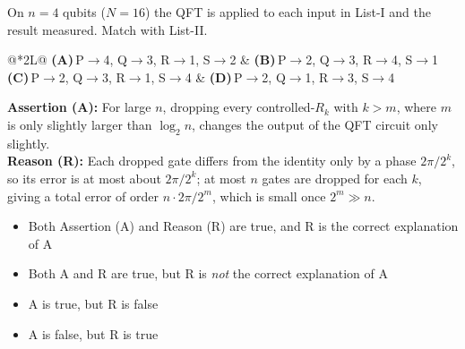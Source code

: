 \documentclass[11pt,a4paper]{article}
\newcommand{\optlabel}[1]{\textbf{(#1)}}
\newenvironment{qitem}[1]{\begin{list}{}{\setlength{\leftmargin}{3.3em}\setlength{\labelwidth}{3.1em}%
  \setlength{\labelsep}{0.2em}\setlength{\topsep}{3pt}\setlength{\parsep}{3pt}}\item[\textbf{Q.#1}\hfill]}{\end{list}}
\newcommand{\qsep}{\par\vspace{2pt}{\color{black!15}\hrule}\vspace{4pt}}
\begin{document}
\begin{qitem}{76}
On $n = 4$ qubits ($N = 16$) the QFT is applied to each input in List-I and the result measured. Match with List-II.
\par\smallskip{}
\par\smallskip\noindent\begin{tabularx}{\linewidth}{@{}*{2}{L}@{}}
\optlabel{A}\,P$\to$4, Q$\to$3, R$\to$1, S$\to$2 & \optlabel{B}\,P$\to$2, Q$\to$3, R$\to$4, S$\to$1 \\[3pt]
\optlabel{C}\,P$\to$2, Q$\to$3, R$\to$1, S$\to$4 & \optlabel{D}\,P$\to$2, Q$\to$1, R$\to$3, S$\to$4
\end{tabularx}
\end{qitem}
\qsep

\begin{qitem}{77}
\textbf{Assertion (A):} For large $n$, dropping every controlled-$R_k$ with $k > m$, where $m$ is only slightly larger than
$\log_2 n$, changes the output of the QFT circuit only slightly.\\[1mm]
\textbf{Reason (R):} Each dropped gate differs from the identity only by a phase $2\pi/2^{k}$, so its error is at most about
$2\pi/2^{k}$; at most $n$ gates are dropped for each $k$, giving a total error of order $n\cdot 2\pi/2^{m}$, which is small once
$2^m \gg n$.
\begin{itemize}[leftmargin=2.6em, labelsep=0.4em, itemsep=2pt, topsep=3pt]
\item[\optlabel{A}] Both Assertion (A) and Reason (R) are true, and R is the correct explanation of A
\item[\optlabel{B}] Both A and R are true, but R is \emph{not} the correct explanation of A
\item[\optlabel{C}] A is true, but R is false
\item[\optlabel{D}] A is false, but R is true
\end{itemize}
\end{qitem}
\qsep
\end{document}
